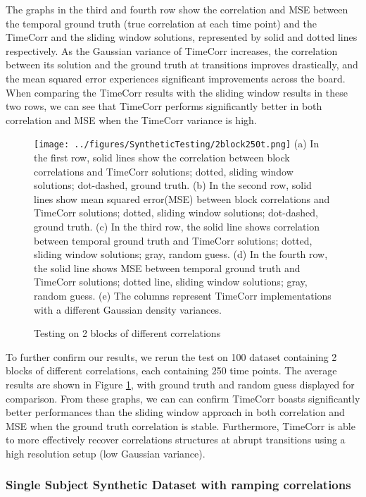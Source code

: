 \documentclass[11pt]{article}
\begin{document}
The graphs in the third and fourth row show the correlation and MSE between the temporal ground truth (true correlation at each time point) and the TimeCorr and the sliding window solutions, represented by solid and dotted lines respectively. As the Gaussian variance of TimeCorr increases, the correlation between its solution and the ground truth at transitions improves drastically, and the mean squared error experiences significant improvements across the board. When comparing the TimeCorr results with the sliding window results in these two rows, we can see that TimeCorr performs significantly better in both correlation and MSE when the TimeCorr variance is high.

\begin{figure}[!htb]
\caption{Testing on 2 blocks of different correlations}
\texttt{[image: ../figures/SyntheticTesting/2block250t.png]}
\label{fig:2block250t}
(a) In the first row, solid lines show the correlation between block correlations and TimeCorr solutions; dotted, sliding window solutions; dot-dashed, ground truth. (b) In the second row, solid lines show mean squared error(MSE) between block correlations and TimeCorr solutions; dotted, sliding window solutions; dot-dashed, ground truth. (c) In the third row, the solid line shows correlation between temporal ground truth and TimeCorr solutions; dotted, sliding window solutions; gray, random guess. (d) In the fourth row, the solid line shows MSE between temporal ground truth and TimeCorr solutions; dotted line, sliding window solutions; gray, random guess. (e) The columns represent TimeCorr implementations with a different Gaussian density variances.
\end{figure}

To further confirm our results, we rerun the test on 100 dataset containing 2 blocks of different correlations, each containing 250 time points. The average results are shown in Figure \ref{fig:2block250t}, with ground truth and random guess displayed for comparison. From these graphs, we can can confirm TimeCorr boasts significantly better performances than the sliding window approach in both correlation and MSE when the ground truth correlation is stable. Furthermore, TimeCorr is able to more effectively recover correlations structures at abrupt transitions using a high resolution setup (low Gaussian variance).

\subsubsection{Single Subject Synthetic Dataset with ramping correlations}
\end{document}
